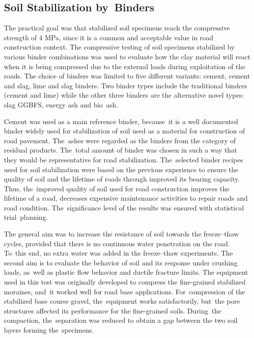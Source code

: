 \documentclass[constrmater,article,accept,pdftex,moreauthors]{Definitions/mdpi}
\begin{document}
\subsection{Soil Stabilization by~Binders}

The practical goal was that stabilized soil specimens reach the compressive strength of 4 MPa, since it is a common and acceptable value in road construction context. {The compressive testing of soil specimens stabilized by various binder combinations was used to evaluate how the clay material will react when it is being compressed due to the external loads during exploitation of the roads. }The choice of binders was limited to five different variants{: }cement, cement and slag,{ }lime and slag binders. {Two} binder types include the traditional binders (cement and lime) while the other three binders are the alternative novel types: slag GGBFS, energy ash and bio~ash. 

Cement was used as a main reference binder, because~it is a well documented binder widely used for {stabilization of} soil{ used as a material for construction of road pavement}. The~ashes were regarded as the binders from the category of residual products. The~total amount of binder was chosen in such a way that they would be representative for road stabilization. The~selected binder recipes used for soil stabilization were based on the previous experience {to ensure the quality of soil and the lifetime of roads through improved its bearing capacity. Thus, the~improved quality of soil used for road construction improves the lifetime of a road, decreases expensive maintenance activities to repair roads and road condition}. The~significance level of the results was ensured with statistical trial~planning. 

The general aim was to increase the resistance of soil towards the freeze--thaw cycles, provided that there is no continuous water penetration on the road. To~this end, no extra water was added in the freeze--thaw experiments. {The second aim is to evaluate the  behavior of soil and its response under crushing loads, as~well as plastic flow behavior and ductile fracture limits. }The equipment used in this test was originally developed to compress the fine-grained stabilized moraines, and~it worked well for road base applications. For~compression of the stabilized base course gravel, the~equipment works satisfactorily, but~the pore structures affected its performance for the fine-grained soils. During~the compaction, the~separation was reduced to obtain a gap between the two soil layers forming the~specimens.
\end{document}
